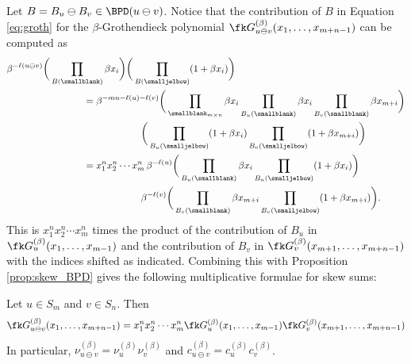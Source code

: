 Let $B = B_u\ominus B_v\in \BPD(u\ominus v)$.
Notice that the contribution of $B$ in Equation \ref{eq:groth} for the $\beta$-Grothendieck polynomial $\fk G_{u\ominus v}^{(\beta)}(x_1,\dots,x_{m+n-1})$ can be computed as
\begin{align*}
    &\beta^{-\ell(u\ominus v)}
    \bigg(
        \prod_{B(\smallblank)} \beta x_i
    \bigg)
    \bigg(
        \prod_{B(\smalljelbow)} (1+\beta x_i)
    \bigg)\\
    &\hspace{8em}=
    \beta^{-mn-\ell(u)-\ell(v)}
    \bigg(
        \prod_{\smallblank_{m\times n}} \beta x_i
        \prod_{B_u(\smallblank)} \beta x_i
        \prod_{B_v(\smallblank)} \beta x_{m+i}
    \bigg)\\
    &\hspace{14em}
    \bigg(
        \prod_{B_u(\smalljelbow)} (1+\beta x_i)
        \prod_{B_v(\smalljelbow)} (1+\beta x_{m+i})
    \bigg)
    \\
    &\hspace{8em}=
    x_1^nx_2^n\cdots x_m^n\, \beta^{-\ell(u)}
    \bigg(
        \prod_{B_u(\smallblank)} \beta x_i
        \prod_{B_u(\smalljelbow)} (1+\beta x_i)
    \bigg)
    \\
    &\hspace{14em}
    \beta^{-\ell(v)}
    \bigg(
        \prod_{B_v(\smallblank)} \beta x_{m+i}
        \prod_{B_v(\smalljelbow)} (1+\beta x_{m+i})
    \bigg).
\end{align*}
This is $x_1^nx_2^n\cdots x_m^n$ times the product of the contribution of $B_u$ in $\fk G_u^{(\beta)}(x_1,\dots,x_{m-1})$ and the contribution of $B_v$ in $\fk G_v^{(\beta)}(x_{m+1},\dots,x_{m+n-1})$ with the indices shifted as indicated.
Combining this with Proposition \ref{prop:skew_BPD} gives the following multiplicative formulae for skew sums:

\begin{proposition}
\label{prop:skew_formulae}
    Let $u\in S_m$ and $v\in S_n$.
    Then \[
        \fk G_{u\ominus v}^{(\beta)}(x_1,\dots,x_{m+n-1})
        = x_1^nx_2^n\cdots x_m^n
        \fk G_u^{(\beta)}(x_1,\dots,x_{m-1})
        \fk G_v^{(\beta)}(x_{m+1},\dots,x_{m+n-1})
    \]
    In particular, $\nu^{(\beta)}_{u\ominus v} = \nu^{(\beta)}_u \nu^{(\beta)}_v$ and 
    $c^{(\beta)}_{u\ominus v} = c^{(\beta)}_u c^{(\beta)}_v$.
\end{proposition}

